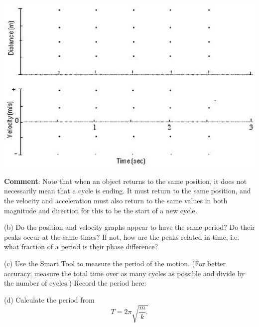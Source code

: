 \vspace{0.3cm}
{\par\centering \includegraphics{periodic_motion_fig1.eps} \par}
\vspace{0.3cm}

\textbf{Comment}: Note that when an object returns to the same position, it 
does not
necessarily mean that a cycle is ending. It must return to the same position,
and the velocity and acceleration must also return to the same values in both
magnitude and direction for this to be the start of a new cycle. 


(b) Do the position and velocity graphs appear to have the same period? Do their
peaks occur at the same times? If not, how are the peaks related in time, i.e. 
what fraction of a period is their phase difference?
\vspace{20mm}

(c) Use the Smart Tool to measure the period of the motion. (For
better accuracy, measure the total time over as many cycles as possible and
divide by the number of cycles.) Record the period here:
\vspace{15mm}

(d) Calculate the period from
\[T=2\pi \sqrt{\frac{m}{k}.}\]

